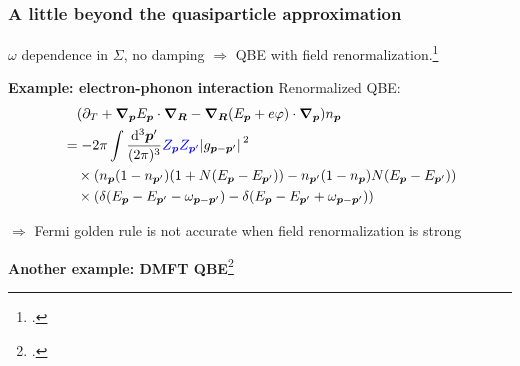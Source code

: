 \documentclass[t]{beamer}
\begin{document}
\begin{frame}
\frametitle{A little beyond the quasiparticle approximation}

$\omega$ dependence in $\Sigma$,
no damping 
$\Rightarrow$ QBE with field renormalization.\footcite{rammer1986quantum}

\vspace{0.25cm}

\textbf{Example: electron-phonon interaction } Renormalized QBE:
\begin{equation}
    \begin{aligned}
        &\quad (\partial_T + \grad_{\vb*{p}} E_{\vb*{p}} \cdot \grad_{\vb*{R}}
        - \grad_{\vb*{R}} (E_{\vb*{p}} + e \varphi) \cdot \grad_{\vb*{p}}) n_{\vb*{p}} \\
        &= - 2 \pi \int \frac{\dd[3]{\vb*{p}'}}{(2\pi)^3} 
        \textcolor{blue}{Z_{\vb*{p}} Z_{\vb*{p}'}}
        \abs*{g_{\vb*{p} - \vb*{p}'}}^2 \\
        &\quad \times (n_{\vb*{p}} (1 - n_{\vb*{p}'}) (1 + N(E_{\vb*{p}} - E_{\vb*{p}'}))
        - n_{\vb*{p}'} (1 - n_{\vb*{p}}) N(E_{\vb*{p}} - E_{\vb*{p}'})) \\
        &\quad \times (\delta(E_{\vb*{p}} - E_{\vb*{p}'} - \omega_{\vb*{p} - \vb*{p}'})
        - \delta(E_{\vb*{p}} - E_{\vb*{p}'} + \omega_{\vb*{p} - \vb*{p}'}))
    \end{aligned}
\end{equation}

$\Rightarrow$ Fermi golden rule is not accurate when field renormalization is strong

\textbf{Another example: DMFT QBE}\footcite{wais2018quantum}

\end{frame}
\end{document}
